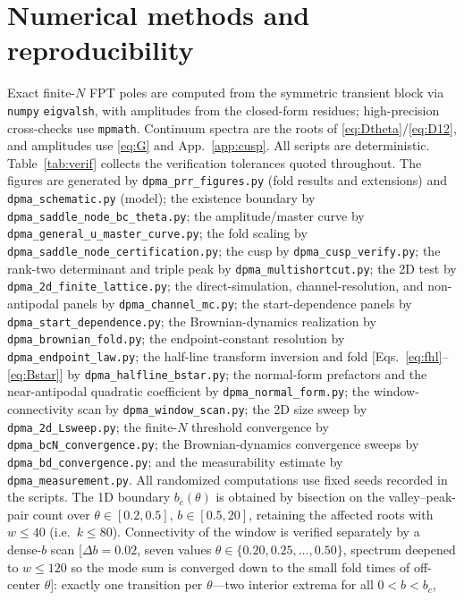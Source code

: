 \documentclass[reprint,amsmath,amssymb,aps,prresearch,longbibliography]{revtex4-2}
\begin{document}
\section{Numerical methods and reproducibility}\label{app:numerics}
Exact finite-$N$ FPT poles are computed from the symmetric transient block via \texttt{numpy}
\texttt{eigvalsh}, with amplitudes from the closed-form residues; high-precision cross-checks use \texttt{mpmath}. Continuum spectra are the roots of
\eqref{eq:Dtheta}/\eqref{eq:D12}, and amplitudes use \eqref{eq:G} and App.~\ref{app:cusp}. All scripts
are deterministic. Table~\ref{tab:verif} collects the verification tolerances quoted throughout.
The figures are generated by \texttt{dpma\_prr\_figures.py} (fold results and extensions) and
\texttt{dpma\_schematic.py}
(model); the existence boundary by \texttt{dpma\_saddle\_node\_bc\_theta.py}; the amplitude/master
curve by \texttt{dpma\_general\_u\_master\_curve.py}; the fold scaling by
\texttt{dpma\_saddle\_node\_certification.py}; the cusp by \texttt{dpma\_cusp\_verify.py}; the rank-two
determinant and triple peak by \texttt{dpma\_multishortcut.py}; the 2D test by
\texttt{dpma\_2d\_finite\_lattice.py}; the direct-simulation, channel-resolution, and non-antipodal panels
by \texttt{dpma\_channel\_mc.py}; the start-dependence panels by \texttt{dpma\_start\_dependence.py}; the Brownian-dynamics
realization by \texttt{dpma\_brownian\_fold.py}; the endpoint-constant resolution by
\texttt{dpma\_endpoint\_law.py}; the half-line transform inversion and fold
[Eqs.~\eqref{eq:fhl}--\eqref{eq:Bstar}] by \texttt{dpma\_halfline\_bstar.py}; the normal-form
prefactors and the near-antipodal quadratic coefficient by \texttt{dpma\_normal\_form.py}; the
window-connectivity scan by \texttt{dpma\_window\_scan.py}; the 2D size sweep by
\texttt{dpma\_2d\_Lsweep.py}; the finite-$N$ threshold convergence by
\texttt{dpma\_bcN\_convergence.py}; the Brownian-dynamics convergence sweeps by
\texttt{dpma\_bd\_convergence.py}; and the
measurability estimate by \texttt{dpma\_measurement.py}. All randomized computations use fixed seeds
recorded in the scripts.
The 1D boundary $b_c(\theta)$ is obtained by bisection on the valley--peak-pair count over
$\theta\in[0.2,0.5]$, $b\in[0.5,20]$, retaining the affected roots with $w\le40$ (i.e.\ $k\le80$).
Connectivity of the window is verified separately by a dense-$b$ scan [$\Delta b=0.02$, seven values
$\theta\in\{0.20,0.25,\dots,0.50\}$, spectrum deepened to $w\le120$ so the mode sum is converged
down to the small fold times of
off-center $\theta$]: exactly one transition per $\theta$---two interior extrema for all $0<b<b_c$,
\end{document}
